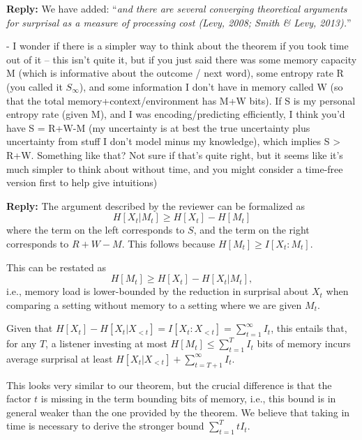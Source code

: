 \documentclass{article}[11pt,a4paper,oneside]
\newenvironment{reply}
  {\par\medskip
   \color{blue}%
   \begin{framed}
   \textbf{Reply: }\ignorespaces}
 {\end{framed}
  \medskip}
\begin{document}
\begin{reply}
	We have added: ``\textit{and there are several converging theoretical arguments for surprisal as a measure of processing cost (Levy, 2008; Smith \& Levy, 2013).}''
\end{reply}

- I wonder if there is a simpler way to think about the theorem if you took time out of it -- this isn't quite it, but if you just said there was some memory capacity M (which is informative about the outcome / next word), some entropy rate R (you called it $S_\infty$), and some information I don't have in memory called W (so that the total memory+context/environment has M+W bits). If S is my personal entropy rate (given M), and I was encoding/predicting efficiently, I think you'd have S = R+W-M (my uncertainty is at best the true uncertainty plus uncertainty from stuff I don't model minus my knowledge), which implies S > R+W. Something like that? Not sure if that's quite right, but it seems like it's much simpler to think about without time, and you might consider a time-free version first to help give intuitions)

\begin{reply}
The argument described by the reviewer can be formalized as
\begin{equation}
H[X_t|M_t] \geq H[X_t] - H[M_t]
\end{equation}
where the term on the left corresponds to $S$, and the term on the right corresponds to $R+W-M$.
This follows because $H[M_t] \ge I[X_t : M_t]$.

This can be restated as 
\begin{equation}
H[M_t] \geq H[X_t] - H[X_t|M_t],
\end{equation}
i.e., memory load is lower-bounded by the reduction in surprisal about $X_t$ when comparing a setting without memory to a setting where we are given $M_t$.

Given that $H[X_t] - H[X_t|X_{<t}] = I[X_t:X_{<t}] = \sum_{t=1}^\infty I_t$, this entails that, for any $T$, a listener investing at most $H[M_t] \leq \sum_{t=1}^T I_t$ bits of memory incurs average surprisal at least $H[X_t|X_{<t}] + \sum_{t=T+1}^\infty I_t$.

This looks very similar to our theorem, but the crucial difference is that the factor $t$ is missing in the term bounding bits of memory, i.e., this bound is in general weaker than the one provided by the theorem.
We believe that taking in time is necessary to derive the stronger bound $\sum_{t=1}^T t I_t$.
\end{reply}
\end{document}
